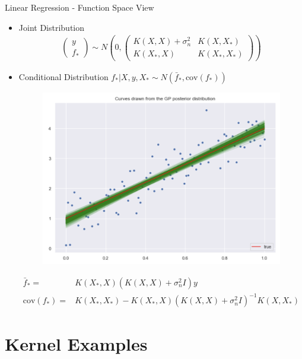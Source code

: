 \documentclass[10pt]{beamer}
\begin{document}
\begin{frame}{Linear Regression - Function Space View}{\cite[Chapter 2.2]{RW05}}
\begin{itemize}
\item Joint Distribution
\begin{align*}
\left(
\begin{array}{c}
y \\
f_*
\end{array}
\right)
\sim
N\left(0, 
\left(
\begin{array}{cc}
K(X,X)+\sigma_n^2 & K(X,X_*) \\
K(X_*,X) & K(X_*,X_*)
\end{array}
\right)
\right)
\end{align*}
\item Conditional Distribution $f_* | X, y, X_*\sim N(\bar{f}_*, \text{cov}(f_*))$
\begin{center}
\begin{figure}
\includegraphics[scale=0.15]{images/gp_lin_posterior.png} 
\end{figure}
\end{center}
\begin{align*}
\bar{f}_* =& K(X_*,X)(K(X,X) + \sigma_n^2 I)y \\
 \text{cov}(f_*) =& K(X_*,X_*) - K(X_*,X)(K(X,X) + \sigma_n^2I)^{-1}K(X,X_*)
\end{align*}
\end{itemize}
\end{frame}


\section{Kernel Examples}
\end{document}
